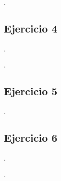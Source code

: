 \lipsum[1].

\vspace*{2em}


\begin{Enunciado}
\subsection*{Ejercicio 4} 
\lipsum[1].
\end{Enunciado}

\vspace*{1em}

\lipsum[1].

\vspace*{2em}

\begin{Enunciado}
\subsection*{Ejercicio 5}
\lipsum[1].
\end{Enunciado}

\vspace*{1em}
    
\lipsum[1]

\vspace*{2em}


\begin{Enunciado}
\subsection*{Ejercicio 6}
\lipsum[1].
\end{Enunciado}

\vspace*{1em}

\lipsum[1].
    
\vspace*{2em}
